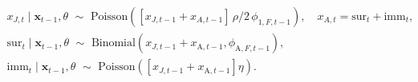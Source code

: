 \begin{gather}
    x_{J, t} \mid \boldsymbol{x}_{t - 1}, \theta 
    \,\, \sim \,\,
    \text{Poisson}\left(
      \left[x_{J, t - 1} + x_{A, t - 1}\right]
      \, \rho / 2 \,
      \phi_{1, F, t - 1} 
    \right),
    \quad 
    x_{A, t} = \text{sur}_{t} + \text{imm}_{t}, \\
    \text{sur}_{t} \mid \boldsymbol{x}_{t - 1}, \theta
    \,\, \sim \,\,
    \text{Binomial}\left(
      x_{J, t - 1} + x_{\mathrm{A}, t - 1},
      \phi_{\mathrm{A}, F, t - 1}
    \right), \\
    \text{imm}_{t} \mid \boldsymbol{x}_{t - 1}, \theta 
    \,\, \sim\,\,
    \text{Poisson}\left(
      \left[x_{J, t - 1} + x_{\mathrm{A}, t - 1}\right] \eta\right
    ).
  \label{eqn:count-data-submodel}
\end{gather}